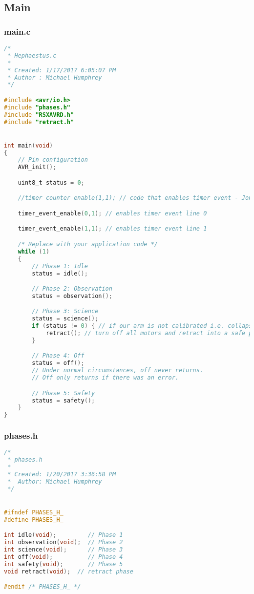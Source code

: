 \subsection{Main}
\subsubsection{main.c}
\begin{lstlisting}[language=C]
/*
 * Hephaestus.c
 *
 * Created: 1/17/2017 6:05:07 PM
 * Author : Michael Humphrey
 */ 

#include <avr/io.h>
#include "phases.h"
#include "RSXAVRD.h"
#include "retract.h"


int main(void)
{
	// Pin configuration
	AVR_init();

	uint8_t status = 0;

	//timer_counter_enable(1,1); // code that enables timer event - Jon says Michael wanted this?

	timer_event_enable(0,1); // enables timer event line 0

	timer_event_enable(1,1); // enables timer event line 1

    /* Replace with your application code */
    while (1) 
    {
		// Phase 1: Idle
		status = idle();

		// Phase 2: Observation
		status = observation();

		// Phase 3: Science
		status = science();
		if (status != 0) { // if our arm is not calibrated i.e. collapsed and in home position...
			retract(); // turn off all motors and retract into a safe position
		}

		// Phase 4: Off
		status = off();
		// Under normal circumstances, off never returns.
		// Off only returns if there was an error.

		// Phase 5: Safety
		status = safety();
    }
}
\end{lstlisting}
\subsubsection{phases.h}
\begin{lstlisting}[language=C]
/*
 * phases.h
 *
 * Created: 1/20/2017 3:36:58 PM
 *  Author: Michael Humphrey
 */ 


#ifndef PHASES_H_
#define PHASES_H_

int idle(void);			// Phase 1
int observation(void);	// Phase 2
int science(void);		// Phase 3
int off(void);			// Phase 4
int safety(void);		// Phase 5
void retract(void);  // retract phase

#endif /* PHASES_H_ */
\end{lstlisting}
